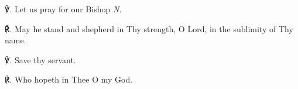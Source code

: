 \begin{otherlanguage}{english}
℣. Let us pray for our Bishop \textit{N.} 

℟. May he stand and shepherd in Thy strength, O Lord, in the sublimity of Thy name.

℣. Save thy servant.

℟. Who hopeth in Thee O my God.

\end{otherlanguage}